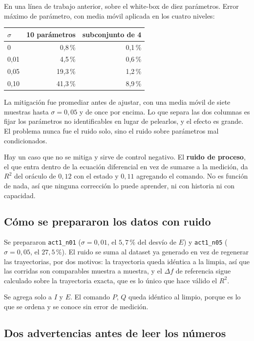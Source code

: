 \documentclass[11pt,a4paper]{article}
\newcommand{\term}[1]{\textbf{#1}}
\begin{document}
En una línea de trabajo anterior, sobre el white-box de diez parámetros. Error
máximo de parámetro, con media móvil aplicada en los cuatro niveles:

\begin{center}
\small
\begin{tabular}{lrr}
\toprule
$\sigma$ & \textbf{10 parámetros} & \textbf{subconjunto de 4} \\
\midrule
0     & 0{,}8\,\%  & 0{,}1\,\% \\
0{,}01 & 4{,}5\,\%  & 0{,}6\,\% \\
0{,}05 & 19{,}3\,\% & 1{,}2\,\% \\
0{,}10 & 41{,}3\,\% & 8{,}9\,\% \\
\bottomrule
\end{tabular}
\end{center}

La mitigación fue promediar antes de ajustar, con una media móvil de siete
muestras hasta $\sigma = 0{,}05$ y de once por encima. Lo que separa las dos
columnas es fijar los parámetros no identificables en lugar de pelearlos, y el
efecto es grande. El problema nunca fue el ruido solo, sino el ruido sobre
parámetros mal condicionados.

Hay un caso que no se mitiga y sirve de control negativo. El \term{ruido de
proceso}, el que entra dentro de la ecuación diferencial en vez de sumarse a la
medición, da $R^2$ del oráculo de $0{,}12$ con el estado y $0{,}11$ agregando el
comando. No es función de nada, así que ninguna corrección lo puede aprender, ni
con historia ni con capacidad.

\subsection{Cómo se prepararon los datos con ruido}

Se prepararon \texttt{act1\_n01} ($\sigma = 0{,}01$, el $5{,}7\,\%$ del desvío de
$E$) y \texttt{act1\_n05} ($\sigma = 0{,}05$, el $27{,}5\,\%$). El ruido se suma
al dataset ya generado en vez de regenerar las trayectorias, por dos motivos: la
trayectoria queda idéntica a la limpia, así que las corridas son comparables
muestra a muestra, y el $\Delta f$ de referencia sigue calculado sobre la
trayectoria exacta, que es lo único que hace válido el $R^2$.

Se agrega solo a $I$ y $E$. El comando $P$, $Q$ queda idéntico al limpio, porque
es lo que se ordena y se conoce sin error de medición.

\subsection{Dos advertencias antes de leer los números}
\end{document}
